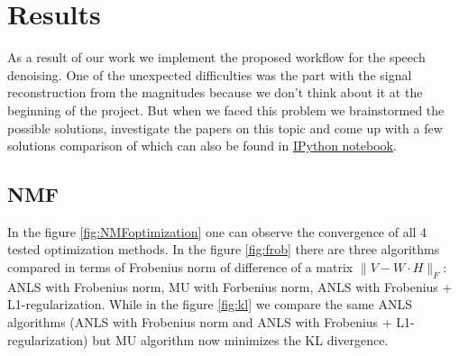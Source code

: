 \documentclass[11pt]{article}
\begin{document}
\section{Results}

As a result of our work we implement the proposed workflow for the speech denoising. One of the unexpected difficulties was the part with the signal reconstruction from the magnitudes because we don't think about it at the beginning of the project. But when we faced this problem we brainstormed the possible solutions, investigate the papers on this topic and come up with a few solutions comparison of which can also be found in \href{https://github.com/elejke/CNMF-ASR/blob/master/code/Denoising_Demo.ipynb}{IPython notebook}.

\subsection{NMF}

In the figure \ref{fig:NMFoptimization} one can observe the convergence of all 4 tested optimization methods. In the figure \ref{fig:frob} there are three algorithms compared in terms of Frobenius norm of difference of a matrix $\|V - W \cdot H\|_{F}$: ANLS with Frobenius norm, MU with Forbenius norm, ANLS with Frobenius + L1-regularization. While in the figure \ref{fig:kl} we compare the same ANLS algorithms (ANLS with Frobenius norm and ANLS with Frobenius + L1-regularization) but MU algorithm now minimizes the KL divergence.
\end{document}

